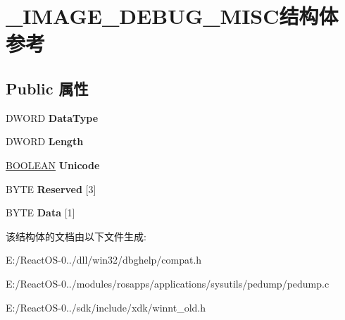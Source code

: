 \hypertarget{struct___i_m_a_g_e___d_e_b_u_g___m_i_s_c}{}\section{\+\_\+\+I\+M\+A\+G\+E\+\_\+\+D\+E\+B\+U\+G\+\_\+\+M\+I\+S\+C结构体 参考}
\label{struct___i_m_a_g_e___d_e_b_u_g___m_i_s_c}
\subsection*{Public 属性}
\begin{DoxyCompactItemize}
\item 
\mbox{\label{struct___i_m_a_g_e___d_e_b_u_g___m_i_s_c_a66cad03916921f44bde07f9e1b8e903e}} 
D\+W\+O\+RD {\bfseries Data\+Type}
\item 
\mbox{\label{struct___i_m_a_g_e___d_e_b_u_g___m_i_s_c_a93de09f8f284e8fc063833f75e063b64}} 
D\+W\+O\+RD {\bfseries Length}
\item 
\mbox{\label{struct___i_m_a_g_e___d_e_b_u_g___m_i_s_c_a9a1fbe115189c31a35ccc80890b36ba7}} 
\hyperlink{_processor_bind_8h_a112e3146cb38b6ee95e64d85842e380a}{B\+O\+O\+L\+E\+AN} {\bfseries Unicode}
\item 
\mbox{\label{struct___i_m_a_g_e___d_e_b_u_g___m_i_s_c_a023053e8ca0a020927145f59739fdf10}} 
B\+Y\+TE {\bfseries Reserved} \mbox{[}3\mbox{]}
\item 
\mbox{\label{struct___i_m_a_g_e___d_e_b_u_g___m_i_s_c_abda6cc8ad48589bd6dfd3aa7bcccd872}} 
B\+Y\+TE {\bfseries Data} \mbox{[}1\mbox{]}
\end{DoxyCompactItemize}


该结构体的文档由以下文件生成\+:\begin{DoxyCompactItemize}
\item 
E\+:/\+React\+O\+S-\/0../dll/win32/dbghelp/compat.\+h\item 
E\+:/\+React\+O\+S-\/0../modules/rosapps/applications/sysutils/pedump/pedump.\+c\item 
E\+:/\+React\+O\+S-\/0../sdk/include/xdk/winnt\+\_\+old.\+h\end{DoxyCompactItemize}
